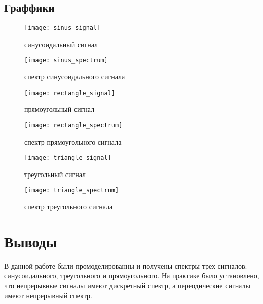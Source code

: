 \subsection{Граффики}

\begin{figure}[H]
	\begin{center}
		\texttt{[image: sinus\_signal]}
		\caption{синусоидальный сигнал} 
		\label{pic:sinus_signal} %
	\end{center}
\end{figure}

\begin{figure}[H]
	\begin{center}
		\texttt{[image: sinus\_spectrum]}
		\caption{спектр синусоидального сигнала} 
		\label{pic:sinus_spectrum} %
	\end{center}
\end{figure}

\begin{figure}[H]
	\begin{center}
		\texttt{[image: rectangle\_signal]}
		\caption{прямоугольный сигнал} 
		\label{pic:rectangle_signal} %
	\end{center}
\end{figure}

\begin{figure}[H]
	\begin{center}
		\texttt{[image: rectangle\_spectrum]}
		\caption{спектр прямоугольного сигнала} 
		\label{pic:rectangle_spectrum} %
	\end{center}
\end{figure}

\begin{figure}[H]
	\begin{center}
		\texttt{[image: triangle\_signal]}
		\caption{треугольный сигнал} 
		\label{pic:triangle_signal} %
	\end{center}
\end{figure}

\begin{figure}[H]
	\begin{center}
		\texttt{[image: triangle\_spectrum]}
		\caption{спектр треугольного сигнала} 
		\label{pic:triangle_spectrum} %
	\end{center}
\end{figure}

\section{Выводы}
В данной работе были промоделированны и получены спектры трех сигналов: синусоидального, треугольного и прямоугольного. На практике было установлено, что непрерывные сигналы имеют дискретный спектр, а переодические сигналы имеют непрерывный спектр.

